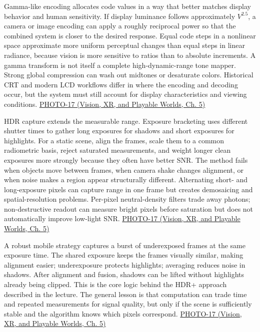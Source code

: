 Gamma-like encoding allocates code values in a way that better matches display behavior and human sensitivity. If display luminance follows approximately \(V^{2.5}\), a camera or image encoding can apply a roughly reciprocal power so that the combined system is closer to the desired response. Equal code steps in a nonlinear space approximate more uniform perceptual changes than equal steps in linear radiance, because vision is more sensitive to ratios than to absolute increments. A gamma transform is not itself a complete high-dynamic-range tone mapper. Strong global compression can wash out midtones or desaturate colors. Historical CRT and modern LCD workflows differ in where the encoding and decoding occur, but the system must still account for display characteristics and viewing conditions. \href{../07-Vision-XR-and-Playable-Worlds/main.pdf\#nameddest=04-visual-computing-ii-ch036-photo-17---photography-session-17}{PHOTO-17 (Vision, XR, and Playable Worlds, Ch. 5)}

HDR capture extends the measurable range. Exposure bracketing uses different shutter times to gather long exposures for shadows and short exposures for highlights. For a static scene, align the frames, scale them to a common radiometric basis, reject saturated measurements, and weight longer clean exposures more strongly because they often have better SNR. The method fails when objects move between frames, when camera shake changes alignment, or when noise makes a region appear structurally different. Alternating short- and long-exposure pixels can capture range in one frame but creates demosaicing and spatial-resolution problems. Per-pixel neutral-density filters trade away photons; non-destructive readout can measure bright pixels before saturation but does not automatically improve low-light SNR. \href{../07-Vision-XR-and-Playable-Worlds/main.pdf\#nameddest=04-visual-computing-ii-ch036-photo-17---photography-session-17}{PHOTO-17 (Vision, XR, and Playable Worlds, Ch. 5)}

A robust mobile strategy captures a burst of underexposed frames at the same exposure time. The shared exposure keeps the frames visually similar, making alignment easier; underexposure protects highlights; averaging reduces noise in shadows. After alignment and fusion, shadows can be lifted without highlights already being clipped. This is the core logic behind the HDR+ approach described in the lecture. The general lesson is that computation can trade time and repeated measurements for signal quality, but only if the scene is sufficiently stable and the algorithm knows which pixels correspond. \href{../07-Vision-XR-and-Playable-Worlds/main.pdf\#nameddest=04-visual-computing-ii-ch036-photo-17---photography-session-17}{PHOTO-17 (Vision, XR, and Playable Worlds, Ch. 5)}

